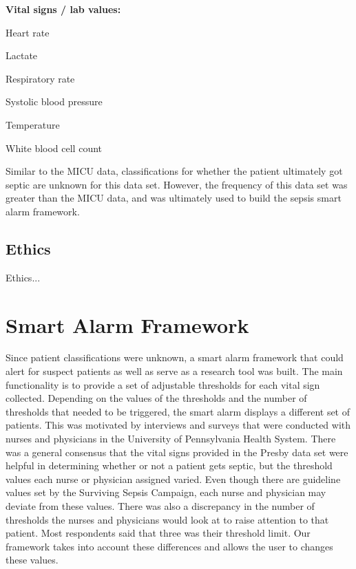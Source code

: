 \documentclass{sig-alternate}
\begin{document}
\noindent \textbf{Vital signs / lab values:}
\begin{itemize*}
  \item Heart rate
  \item Lactate
  \item Respiratory rate
  \item Systolic blood pressure
  \item Temperature
  \item White blood cell count
\end{itemize*}

Similar to the MICU data, classifications for whether the patient ultimately got septic are unknown for this data set.  However, the frequency of this data set was greater than the MICU data, and was ultimately used to build the sepsis smart alarm framework.  

\vspace{10pt}
\subsection{Ethics}
\label{subsec:ethics}
\vspace{10pt}

Ethics...

\vspace{10pt}
\section{Smart Alarm Framework}
\vspace{10pt}
\label{sec:framework}

Since patient classifications were unknown, a smart alarm framework that could alert for suspect patients as well as serve as a research tool was built.  The main functionality is to provide a set of adjustable thresholds for each vital sign collected.  Depending on the values of the thresholds and the number of thresholds that needed to be triggered, the smart alarm displays a different set of patients.  This was motivated by interviews and surveys that were conducted with nurses and physicians in the University of Pennsylvania Health System.  There was a general consensus that the vital signs provided in the Presby data set were helpful in determining whether or not a patient gets septic, but the threshold values each nurse or physician assigned varied.  Even though there are guideline values set by the Surviving Sepsis Campaign, each nurse and physician may deviate from these values.  There was also a discrepancy in the number of thresholds the nurses and physicians would look at to raise attention to that patient.  Most respondents said that three was their threshold limit.  Our framework takes into account these differences and allows the user to changes these values.
\end{document}
